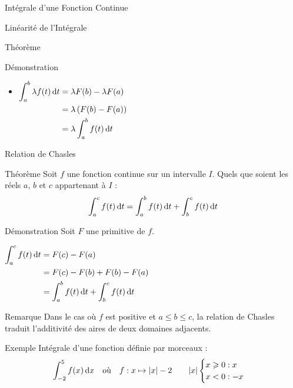 \documentclass{coursbook}
\begin{document}
\begin{Gpartie}{Intégrale d'une Fonction Continue}
\begin{Spartie}{Linéarité de l'Intégrale}
\begin{SSpartie}{Théorème}
\begin{SSSpartie}{Démonstration}
\begin{itemize}
                        $\begin{aligned}[t]
                            \int_a^b\left(f+g\right)(t)\dt&=\left(F+G\right)(t)-\left(F+G\right)(t) \\
                            &=F(b)+G(b)-F(a)-G(a) \\
                            &=F(b)-F(a)+G(b)-G(a) \\
                            &=\int_a^b f(t)\dt+\int_a^b g(t)\dt
                        \end{aligned}$

                        \item $\begin{aligned}[t]
                            \int_a^b\lambda f(t)\,\mathrm{d}t&=\lambda F(b)-\lambda F(a) \\
                            &=\lambda\left(F(b)-F(a)\right) \\
                            &=\lambda\int_a^b f(t)\,\mathrm{d}t
                        \end{aligned}$
                    \end{itemize}
                \end{SSSpartie}
            \end{SSpartie}
        \end{Spartie}
        \begin{Spartie}{Relation de Chasles} 
            \begin{SSpartie}{Théorème} 
                Soit $f$ une fonction continue sur un intervalle $I$. Quels que soient les réels $a$, $b$ et $c$ appartenant à $I$ : \[\int_a^c f(t)\,\mathrm{d}t=\int_a^b f(t)\,\mathrm{d}t+\int_b^cf(t)\,\mathrm{d}t\]
                \begin{SSSpartie}{Démonstration} 
                    Soit $F$ une primitive de $f$.

                    $\begin{aligned}[t]
                        \int_a^c f(t)\,\mathrm{d}t&=F(c)-F(a) \\
                        &=F(c)-F(b)+F(b)-F(a) \\
                        &=\int_a^b f(t)\,\mathrm{d}t+\int_b^c f(t)\,\mathrm{d}t
                    \end{aligned}$
                \end{SSSpartie}
            \end{SSpartie}
            \begin{SSpartie}{Remarque} 
                Dans le cas où $f$ est positive et $a\leq b\leq c$, la relation de Chasles traduit l'additivité des aires de deux domaines adjacents.
            \end{SSpartie}
            \begin{SSpartie}{Exemple} 
                Intégrale d'une fonction définie par morceaux : \[\int_{-2}^5f(x)\,\mathrm{d}x\quad\text{où}\quad f:x\mapsto\lvert x\rvert-2\qquad\lvert x\rvert\begin{cases}x\geqslant0:x\\x<0:-x\end{cases}\]


\end{SSpartie}
\end{Spartie}
\end{Gpartie}
\end{document}
